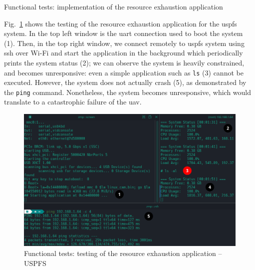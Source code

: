 \begin{longlisting}
\centering
\inputminted[]{c}{./listing/user_memhog.c}
\caption{Functional tests: implementation of the resource exhaustion
  application}
\label{lst:user-memhog}
\end{longlisting}



Fig.~\ref{fig:user-memhog-test} shows the testing of the resource exhaustion
application for the \gls{uspfs} system. In the top
left window is the \gls{uart} connection used to boot the system (1). Then, in
the top right window, we
connect remotely to \gls{uspfs} system using \gls{ssh} over Wi-Fi and start the
application in the background which periodically prints the system status (2);
we can observe the system is heavily constrained, and becomes unresponsive: even
a simple application such as \lstinline{ls} (3) cannot be executed. However,
the system does not actually crash (5), as demonstrated by the \lstinline{ping}
command. Nonetheless, the system becomes unresponsive, which would translate to a catastrophic failure of the \gls{uav}.

\begin{figure}[!hbt]
  \centering
  \includegraphics[width=1.0\textwidth]{./img/png/user-memhog-test-annot} 
  \caption{Functional tests: testing of the resource exhaustion application -- USPFS}%
  \label{fig:user-memhog-test}
\end{figure}


